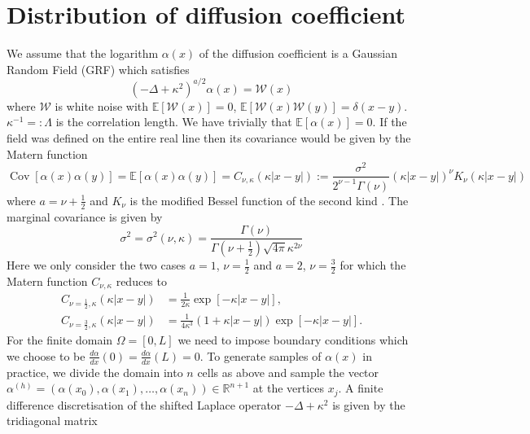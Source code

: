 \documentclass[11pt]{article}
\begin{document}
\section{Distribution of diffusion coefficient}
We assume that the logarithm $\alpha(x)$ of the diffusion coefficient is a Gaussian Random Field (GRF) which satisfies
\begin{equation}
    (-\Delta + \kappa^2)^{a/2}\alpha(x) = \mathcal{W}(x)
\end{equation}
where $\mathcal{W}$ is white noise with $\mathbb{E}[\mathcal{W}(x)]=0$, $\mathbb{E}[\mathcal{W}(x)\mathcal{W}(y)] = \delta(x-y)$. $\kappa^{-1}=:\Lambda$ is the correlation length. We have trivially that $\mathbb{E}[\alpha(x)]=0$. If the field was defined on the entire real line then its covariance would be given by the Matern function
\begin{equation}
    \operatorname{Cov}[\alpha(x)\alpha(y)]=\mathbb{E}[\alpha(x)\alpha(y)] = C_{\nu,\kappa}(\kappa |x-y|):=\frac{\sigma^2}{2^{\nu-1}\Gamma(\nu)}\left(\kappa |x-y|\right)^\nu K_\nu(\kappa|x-y|) 
\end{equation}
where $a = \nu+\frac{1}{2}$ and $K_\nu$ is the modified Bessel function of the second kind \cite{lindgren2011explicit}.
The marginal covariance is given by
\begin{equation}
    \sigma^2 = \sigma^2(\nu,\kappa) = \frac{\Gamma(\nu)}{\Gamma(\nu+\frac{1}{2})\sqrt{4\pi}\kappa^{2\nu}}
\end{equation}
Here we only consider the two cases $a=1$, $\nu=\frac{1}{2}$ and $a=2$, $\nu=\frac{3}{2}$ for which the Matern function $C_{\nu,\kappa}$ reduces to 
\begin{equation}
\begin{aligned}
        C_{\nu=\frac{1}{2},\kappa}(\kappa|x-y|) &= \frac{1}{2\kappa}\exp[-\kappa|x-y|],\\
        C_{\nu=\frac{3}{2},\kappa}(\kappa|x-y|) &= \frac{1}{4\kappa^3}\left(1+\kappa|x-y|\right)\exp[-\kappa|x-y|].
\end{aligned}
\end{equation}
For the finite domain $\Omega=[0,L]$ we need to impose boundary conditions which we choose to be $\frac{d\alpha}{dx}(0)=\frac{d\alpha}{dx}(L)=0$. To generate samples of $\alpha(x)$ in practice, we divide the domain into $n$ cells as above and sample the vector $\alpha^{(h)}=(\alpha(x_0),\alpha(x_1),\dots,\alpha(x_n))\in\mathbb{R}^{n+1}$ at the vertices $x_j$. A finite difference discretisation of the shifted Laplace operator $-\Delta + \kappa^2$ is given by the tridiagonal matrix
\end{document}
